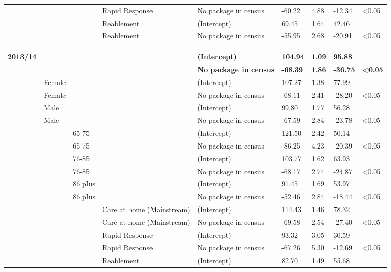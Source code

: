 \documentclass[]{article}
\begin{document}
\begin{landscape}
\begin{longtable}[c]{@{}lllllllll@{}}
 &  &  & Rapid Response & No package in census & -60.22 & 4.88 & -12.34 & \textless{}0.05 \\
 &  &  & Reablement & (Intercept) & 69.45 & 1.64 & 42.46 &  \\
 &  &  & Reablement & No package in census & -55.95 & 2.68 & -20.91 & \textless{}0.05 \\
 \\
 \\
 \\
\textbf{2013/14} & \textbf{} & \textbf{} & \textbf{} & \textbf{(Intercept)} & \textbf{104.94} & \textbf{1.09} & \textbf{95.88} & \textbf{} \\
\textbf{} & \textbf{} & \textbf{} & \textbf{} & \textbf{No package in census} & \textbf{-68.39} & \textbf{1.86} & \textbf{-36.75} & \textbf{\textless{}0.05} \\
 & Female &  &  & (Intercept) & 107.27 & 1.38 & 77.99 &  \\
 & Female &  &  & No package in census & -68.11 & 2.41 & -28.20 & \textless{}0.05 \\
 & Male &  &  & (Intercept) & 99.80 & 1.77 & 56.28 &  \\
 & Male &  &  & No package in census & -67.59 & 2.84 & -23.78 & \textless{}0.05 \\
 &  & 65-75 &  & (Intercept) & 121.50 & 2.42 & 50.14 &  \\
 &  & 65-75 &  & No package in census & -86.25 & 4.23 & -20.39 & \textless{}0.05 \\
 &  & 76-85 &  & (Intercept) & 103.77 & 1.62 & 63.93 &  \\
 &  & 76-85 &  & No package in census & -68.17 & 2.74 & -24.87 & \textless{}0.05 \\
 &  & 86 plus &  & (Intercept) & 91.45 & 1.69 & 53.97 &  \\
 &  & 86 plus &  & No package in census & -52.46 & 2.84 & -18.44 & \textless{}0.05 \\
 &  &  & Care at home (Mainstream) & (Intercept) & 114.43 & 1.46 & 78.32 &  \\
 &  &  & Care at home (Mainstream) & No package in census & -69.58 & 2.54 & -27.40 & \textless{}0.05 \\
 &  &  & Rapid Response & (Intercept) & 93.32 & 3.05 & 30.59 &  \\
 &  &  & Rapid Response & No package in census & -67.26 & 5.30 & -12.69 & \textless{}0.05 \\
 &  &  & Reablement & (Intercept) & 82.70 & 1.49 & 55.68 &  \\

\end{longtable}
\end{landscape}
\end{document}
